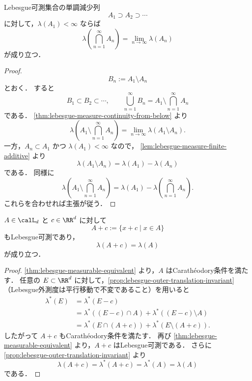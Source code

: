 \begin{theorem}[上からの連続性]
\label{thm:lebesgue-measure-continuity-from-above}
Lebesgue可測集合の単調減少列
\[
A_1\supset A_2\supset\cdots
\]
に対して，$\lambda(A_1)<\infty$ ならば
\[
\lambda\left(\bigcap_{n=1}^{\infty}A_n\right)
=
\lim_{n\to\infty}\lambda(A_n)
\]
が成り立つ．
\end{theorem}
\begin{proof}
\[
B_n:=A_1\setminus A_n
\]
とおく．
すると
\[
B_1\subset B_2\subset\cdots,
\qquad
\bigcup_{n=1}^{\infty}B_n
=
A_1\setminus\bigcap_{n=1}^{\infty}A_n
\]
である．
\cref{thm:lebesgue-measure-continuity-from-below} より
\[
\lambda\left(A_1\setminus\bigcap_{n=1}^{\infty}A_n\right)
=
\lim_{n\to\infty}\lambda(A_1\setminus A_n).
\]
一方，$A_n\subset A_1$ かつ $\lambda(A_1)<\infty$ なので，
\cref{lem:lebesgue-measure-finite-additive} より
\[
\lambda(A_1\setminus A_n)=\lambda(A_1)-\lambda(A_n)
\]
である．
同様に
\[
\lambda\left(A_1\setminus\bigcap_{n=1}^{\infty}A_n\right)
=
\lambda(A_1)-\lambda\left(\bigcap_{n=1}^{\infty}A_n\right).
\]
これらを合わせれば主張が従う．
\end{proof}

\begin{proposition}[平行移動不変性]
\label{prop:lebesgue-measure-translation-invariant}
$A\in\calL_d$ と $c\in\RR^d$ に対して
\[
A+c:=\{x+c\mid x\in A\}
\]
もLebesgue可測であり，
\[
\lambda(A+c)=\lambda(A)
\]
が成り立つ．
\end{proposition}
\begin{proof}
\cref{thm:lebesgue-measurable-equivalent} より，$A$ はCarathéodory条件を満たす．
任意の $E\subset\RR^d$ に対して，\cref{prop:lebesgue-outer-translation-invariant}
（Lebesgue外測度は平行移動で不変であること）を用いると
\begin{align*}
\lambda^*(E)
&=
\lambda^*(E-c)\\
&=
\lambda^*((E-c)\cap A)+\lambda^*((E-c)\setminus A)\\
&=
\lambda^*(E\cap(A+c))+\lambda^*(E\setminus(A+c)).
\end{align*}
したがって $A+c$ もCarathéodory条件を満たす．
再び \cref{thm:lebesgue-measurable-equivalent} より，$A+c$ はLebesgue可測である．
さらに \cref{prop:lebesgue-outer-translation-invariant} より
\[
\lambda(A+c)=\lambda^*(A+c)=\lambda^*(A)=\lambda(A)
\]
である．
\end{proof}
